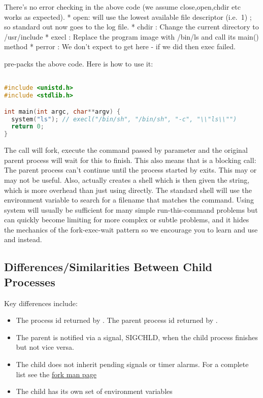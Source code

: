 There's no error checking in the above code (we assume close,open,chdir etc works as expected). * open: will use the lowest available file descriptor (i.e.~1) ; so standard out now goes to the log file. * chdir : Change the current directory to /usr/include * execl : Replace the program image with /bin/ls and call its main() method * perror : We don't expect to get here - if we did then exec failed.

 pre-packs the above code. Here is how to use it:

\begin{lstlisting}[language=C]

#include <unistd.h>
#include <stdlib.h>

int main(int argc, char**argv) {
  system("ls"); // execl("/bin/sh", "/bin/sh", "-c", "\\"ls\\"")
  return 0;
}
\end{lstlisting}

The  call will fork, execute the command passed by parameter and the original parent process will wait for this to finish. This also means that  is a blocking call: The parent process can't continue until the process started by  exits. This may or may not be useful. Also,  actually creates a shell which is then given the string, which is more overhead than just using  directly. The standard shell will use the  environment variable to search for a filename that matches the command. Using system will usually be sufficient for many simple run-this-command problems but can quickly become limiting for more complex or subtle problems, and it hides the mechanics of the fork-exec-wait pattern so we encourage you to learn and use   and  instead.

\subsection{Differences/Similarities Between Child Processes}

Key differences include: 
\begin{itemize}
\item The process id returned by . The parent process id returned by . 
\item The parent is notified via a signal, SIGCHLD, when the child process finishes but not vice versa. 
\item The child does not inherit pending signals or timer alarms. For a complete list see the \href{http://man7.org/linux/man-pages/man2/fork.2.html}{fork man page}
\item The child has its own set of environment variables
\end{itemize}

